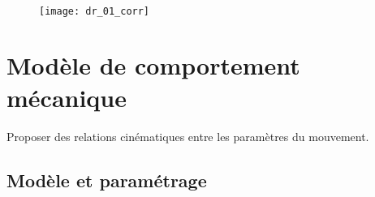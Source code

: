 \ifprof
\begin{corrige} ~\\
\begin{figure}[H] 
\centering
\texttt{[image: dr\_01\_corr]}
\end{figure}
\end{corrige}
\else
\fi


\section{Modèle de comportement mécanique}
\begin{obj}
Proposer des relations cinématiques entre les paramètres du mouvement.
\end{obj}

\subsection{Modèle et paramétrage}

\ifprof
\else


